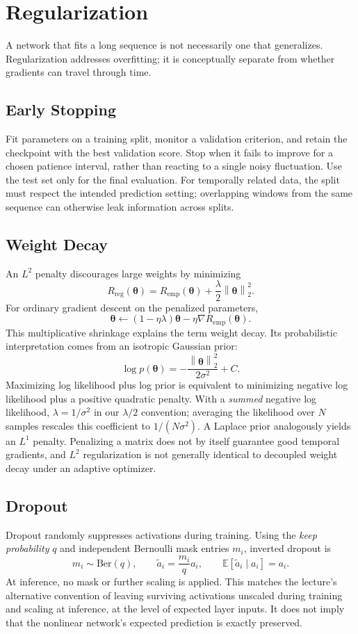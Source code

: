 \documentclass[11pt, oneside]{book}
\newcommand{\E}{\mathbb{E}}              %
\newcommand{\norm}[1]{\left\lVert #1 \right\rVert}
\newcommand{\params}{\boldsymbol{\theta}}   %
\newcommand{\Bernoulli}{\mathrm{Ber}}
\let\originalsection\section
\renewcommand{\section}{\Needspace{7\baselineskip}\originalsection}
\let\originalsubsection\subsection
\renewcommand{\subsection}{\Needspace{6\baselineskip}\originalsubsection}
\begin{document}
\section{Regularization}\label{sec:source-2-3}
A network that fits a long sequence is not necessarily one that generalizes. Regularization addresses overfitting; it is conceptually separate from whether gradients can travel through time.

\subsection{Early Stopping}\label{sec:source-2-3-1}
Fit parameters on a training split, monitor a validation criterion, and retain the checkpoint with the best validation score. Stop when it fails to improve for a chosen patience interval, rather than reacting to a single noisy fluctuation. Use the test set only for the final evaluation. For temporally related data, the split must respect the intended prediction setting; overlapping windows from the same sequence can otherwise leak information across splits.

\subsection{Weight Decay}\label{sec:source-2-3-2}
An $L^2$ penalty discourages large weights by minimizing
\[
 R_{\mathrm{reg}}(\params)=R_{\mathrm{emp}}(\params)+\frac\lambda2\norm{\params}_2^2.
\]
For ordinary gradient descent on the penalized parameters,
\[
 \params\leftarrow(1-\eta\lambda)\params-\eta\nabla R_{\mathrm{emp}}(\params).
\]
This multiplicative shrinkage explains the term weight decay. Its probabilistic interpretation comes from an isotropic Gaussian prior:
\[
 \log p(\params)=-\frac{\norm{\params}_2^2}{2\sigma^2}+C.
\]
Maximizing log likelihood plus log prior is equivalent to minimizing negative log likelihood plus a positive quadratic penalty. With a \emph{summed} negative log likelihood, $\lambda=1/\sigma^2$ in our $\lambda/2$ convention; averaging the likelihood over $N$ samples rescales this coefficient to $1/(N\sigma^2)$. A Laplace prior analogously yields an $L^1$ penalty. Penalizing a matrix does not by itself guarantee good temporal gradients, and $L^2$ regularization is not generally identical to decoupled weight decay under an adaptive optimizer.

\subsection{Dropout}\label{sec:source-2-3-3}
Dropout randomly suppresses activations during training. Using the \emph{keep probability} $q$ and independent Bernoulli mask entries $m_i$, inverted dropout is
\[
 m_i\sim\Bernoulli(q),\qquad \widetilde a_i=\frac{m_i}{q}a_i,
 \qquad \E[\widetilde a_i\mid a_i]=a_i.
\]
At inference, no mask or further scaling is applied. This matches the lecture's alternative convention of leaving surviving activations unscaled during training and scaling at inference, at the level of expected layer inputs. It does not imply that the nonlinear network's expected prediction is exactly preserved.
\end{document}
